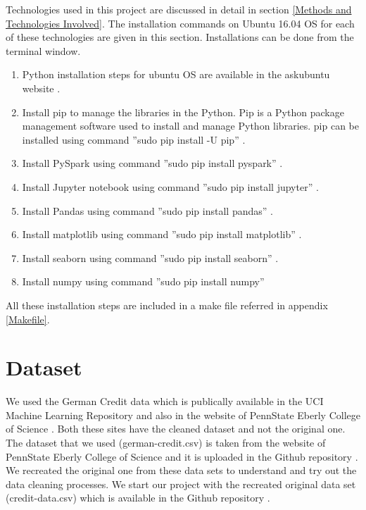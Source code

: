 \documentclass[sigconf]{acmart}
\begin{document}
Technologies used in this project are discussed in detail in section \ref{Methods and Technologies Involved}. The installation commands on Ubuntu 16.04 OS for each of these technologies are given in this section. Installations can be done from the terminal window. 

\begin{enumerate}
  \item Python installation steps for ubuntu OS are available in the askubuntu website \cite{python-installations}.
  \item Install pip to manage the libraries in the Python. Pip is a Python package management software used to install and manage Python libraries. pip can be installed using command ''sudo pip install -U pip'' \cite{pip-package}.   
  \item Install PySpark using command ''sudo pip install pyspark'' \cite{pyspark-installation}.
  \item Install Jupyter notebook using command ''sudo pip install jupyter'' \cite{jupyter-installation}.
   \item Install Pandas using command ''sudo pip install pandas'' \cite{pandas-installation}.
   \item Install matplotlib using command ''sudo pip install matplotlib'' \cite{matplotlib-installation}.
   \item Install seaborn using command ''sudo pip install seaborn'' \cite{seaborn-installation}.
   \item Install numpy using command ''sudo pip install numpy'' \cite{numpy-installation}
\end{enumerate}

All these installation steps are included in a make file referred in appendix \ref{Makefile}.

\section{Dataset}

We used the German Credit data which is publically available in the UCI Machine Learning Repository \cite{uci} and also in the website of PennState Eberly College of Science \cite{psu-site}. Both these sites have the cleaned dataset and not the original one. The dataset that we used (german-credit.csv) is taken from the website of PennState Eberly College of Science \cite{psu-site} and it is uploaded in the Github repository \cite{github}. We recreated the original one from these data sets to understand and try out the data cleaning processes. We start our project with the recreated original data set (credit-data.csv) which is available in the Github repository \cite{github}. 
\end{document}
